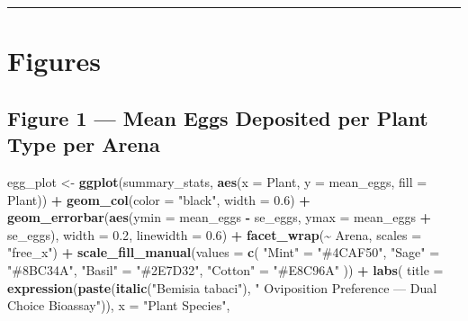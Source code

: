 \documentclass[
]{article}
\newenvironment{Shaded}{\begin{snugshade}}{\end{snugshade}}
\newcommand{\AttributeTok}[1]{\textcolor[rgb]{0.13,0.29,0.53}{#1}}
\newcommand{\FloatTok}[1]{\textcolor[rgb]{0.00,0.00,0.81}{#1}}
\newcommand{\FunctionTok}[1]{\textcolor[rgb]{0.13,0.29,0.53}{\textbf{#1}}}
\newcommand{\NormalTok}[1]{#1}
\newcommand{\OtherTok}[1]{\textcolor[rgb]{0.56,0.35,0.01}{#1}}
\newcommand{\SpecialCharTok}[1]{\textcolor[rgb]{0.81,0.36,0.00}{\textbf{#1}}}
\newcommand{\StringTok}[1]{\textcolor[rgb]{0.31,0.60,0.02}{#1}}
\begin{document}
\begin{center}\rule{0.5\linewidth}{0.5pt}\end{center}

\section{Figures}\label{figures}

\subsection{Figure 1 --- Mean Eggs Deposited per Plant Type per
Arena}\label{figure-1-mean-eggs-deposited-per-plant-type-per-arena}

\begin{Shaded}
\begin{Highlighting}[]
\NormalTok{egg\_plot }\OtherTok{\textless{}{-}} \FunctionTok{ggplot}\NormalTok{(summary\_stats,}
       \FunctionTok{aes}\NormalTok{(}\AttributeTok{x =}\NormalTok{ Plant, }\AttributeTok{y =}\NormalTok{ mean\_eggs, }\AttributeTok{fill =}\NormalTok{ Plant)) }\SpecialCharTok{+}
  \FunctionTok{geom\_col}\NormalTok{(}\AttributeTok{color =} \StringTok{"black"}\NormalTok{, }\AttributeTok{width =} \FloatTok{0.6}\NormalTok{) }\SpecialCharTok{+}
  \FunctionTok{geom\_errorbar}\NormalTok{(}\FunctionTok{aes}\NormalTok{(}\AttributeTok{ymin =}\NormalTok{ mean\_eggs }\SpecialCharTok{{-}}\NormalTok{ se\_eggs,}
                    \AttributeTok{ymax =}\NormalTok{ mean\_eggs }\SpecialCharTok{+}\NormalTok{ se\_eggs),}
                \AttributeTok{width =} \FloatTok{0.2}\NormalTok{, }\AttributeTok{linewidth =} \FloatTok{0.6}\NormalTok{) }\SpecialCharTok{+}
  \FunctionTok{facet\_wrap}\NormalTok{(}\SpecialCharTok{\textasciitilde{}}\NormalTok{ Arena, }\AttributeTok{scales =} \StringTok{"free\_x"}\NormalTok{) }\SpecialCharTok{+}
  \FunctionTok{scale\_fill\_manual}\NormalTok{(}\AttributeTok{values =} \FunctionTok{c}\NormalTok{(}
    \StringTok{"Mint"}   \OtherTok{=} \StringTok{"\#4CAF50"}\NormalTok{,}
    \StringTok{"Sage"}   \OtherTok{=} \StringTok{"\#8BC34A"}\NormalTok{,}
    \StringTok{"Basil"}  \OtherTok{=} \StringTok{"\#2E7D32"}\NormalTok{,}
    \StringTok{"Cotton"} \OtherTok{=} \StringTok{"\#E8C96A"}
\NormalTok{  )) }\SpecialCharTok{+}
  \FunctionTok{labs}\NormalTok{(}
    \AttributeTok{title    =} \FunctionTok{expression}\NormalTok{(}\FunctionTok{paste}\NormalTok{(}\FunctionTok{italic}\NormalTok{(}\StringTok{"Bemisia tabaci"}\NormalTok{), }\StringTok{" Oviposition Preference — Dual Choice Bioassay"}\NormalTok{)),}
    \AttributeTok{x        =} \StringTok{"Plant Species"}\NormalTok{,}

\end{Highlighting}
\end{Shaded}
\end{document}
